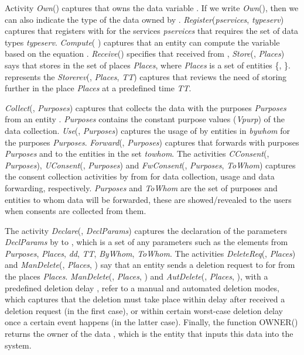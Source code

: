 \documentclass[a4paper]{article}
\begin{document}
Activity \textit{Own}() captures that  owns the data variable . If we write \textit{Own}(), then we can also indicate the type of the data owned by . \textit{Register}(\textit{pservices}, \textit{typeserv}) captures that  registers with  for the services \textit{pservices} that requires the set of data types \textit{typeserv}. \textit{Compute}(  ) captures that an entity  can compute the variable  based on the equation   . \textit{Receive}() specifies that  received  from ,    
\textit{Store}(, \textit{Places}) says that  stores  in the set of places \textit{Places}, where \textit{Places} is a set of entities   \{, \}.  represents the  \textit{Storerev}(, \textit{Places}, \textit{TT}) captures that  reviews the need of storing  further in the place \textit{Places} at a predefined time \textit{TT}. 

\textit{Collect}(, \textit{Purposes}) captures that  collects the data  with the purposes \textit{Purposes} from an entity . \textit{Purposes} contains the constant purpose values (\textit{Vpurp}) of the data collection. \textit{Use}(, \textit{Purposes}) captures the usage of  by entities in \textit{bywhom} for the purposes \textit{Purposes}. \textit{Forward}(, \textit{Purposes}) captures that  forwards  with purposes \textit{Purposes} and to the entities in the set \textit{towhom}.  The activities \textit{CConsent}(, \textit{Purposes}), \textit{UConsent}(, \textit{Purposes}) and \textit{FwConsent}(, \textit{Purposes}, \textit{ToWhom}) captures the consent collection activities by  from  for data collection, usage and data forwarding, respectively. \textit{Purposes} and \textit{ToWhom} are the set of purposes and entities to whom data  will be forwarded, these are showed/revealed to the users when consents are collected from them.  

 
 The activity \textit{Declare}(, \textit{DeclParams}) captures the declaration of the parameters  \textit{DeclParams} by  to , which is a set of any parameters such as the elements from \textit{Purposes}, \textit{Places}, \textit{dd}, \textit{TT}, \textit{ByWhom}, \textit{ToWhom}. The activities \textit{DeleteReq}(, \textit{Places}) and \textit{ManDelete}(, \textit{Places},  ) say that an entity  sends a deletion request to  for   from the places \textit{Places}. \textit{ManDelete}(, \textit{Places},  ) and \textit{AutDelete}(, \textit{Places},  ), with a predefined deletion delay , refer to a manual and automated deletion modes, which captures that the deletion must take place within  delay after  received a deletion request (in the first case), or within certain worst-case deletion delay once a certain event happens (in the latter case).  Finally, the function OWNER() returns the owner of the data , which is the entity that inputs this data into the system.    
\end{document}
